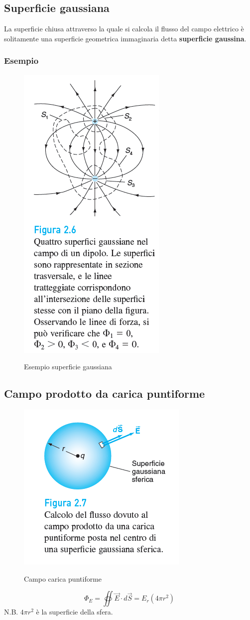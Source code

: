 \subsection{Superficie gaussiana}
La superficie chiusa attraverso la quale si calcola il flusso del campo elettrico
è solitamente una superficie geometrica immaginaria detta \textbf{superficie gaussina}.

\subsubsection{Esempio}
\begin{figure}[H]
    \centering
    \includegraphics[width=0.25\linewidth]{imgs/4 - superficie gaussiana.png}
    \label{fig:esempio_sup_gaussiana}
    \caption{Esempio superficie gaussiana}
\end{figure}

\subsection{Campo prodotto da carica puntiforme}
\begin{figure}[H]
    \centering
    \includegraphics[width=0.25\linewidth]{imgs/5 - calcolo flusso sfera.png}
    \label{fig:esercizio_gauss_sfera}
    \caption{Campo carica puntiforme}
\end{figure}
\begin{equation}
    \Phi_E = \oiint{\vec{E}\cdot d\vec{S}} = E_r(4\pi r^2)
\end{equation}
N.B. $4\pi r^2$ è la superficie della sfera.


